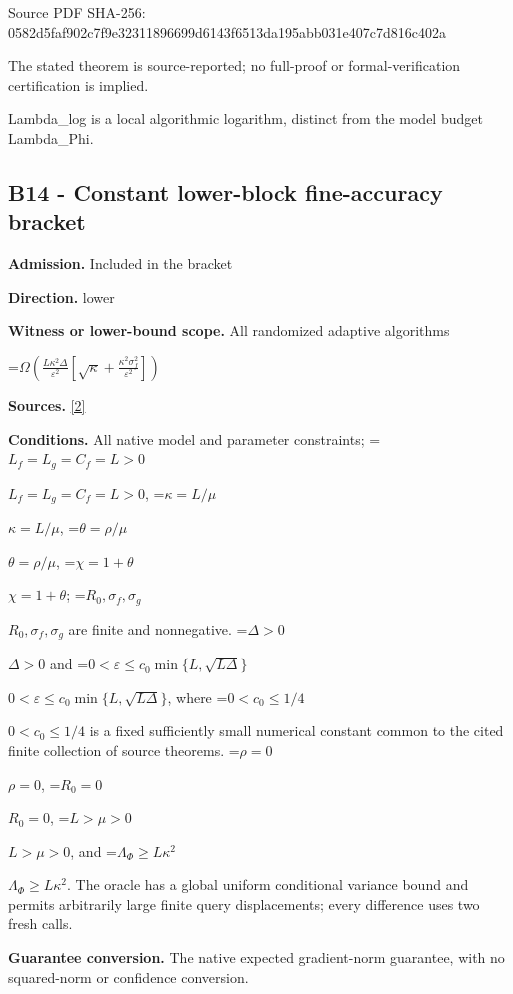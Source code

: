 \documentclass[10pt,a4paper]{article}
\newcommand{\AtlasMath}[1]{\par\begingroup\centering\setbox0=\hbox{$\displaystyle #1$}\ifdim\wd0>1.4\linewidth\typeout{ATLAS WIDE FORMULA: \the\wd0}\fi\ifdim\wd0>\linewidth\resizebox{\linewidth}{!}{\box0}\else\box0\fi\par\endgroup}
\newcommand{\AtlasInlineMath}[1]{\begingroup\setbox0=\hbox{$#1$}\ifdim\wd0>.4\linewidth\endgroup\AtlasMath{#1}\else\endgroup$#1$\fi}
\begin{document}
Source PDF SHA-256: 0582d5faf902c7f9e3231189\allowbreak{}6699d6143f6513da195abb03\allowbreak{}1e407c7d816c402a



The stated theorem is source-reported; no full-proof or formal-verification certification is implied.



Lambda\_log is a local algorithmic logarithm, distinct from the model budget Lambda\_Phi.



\subsection{B14 - Constant lower-block fine-accuracy bracket}


\textbf{Admission.} Included in the bracket



\textbf{Direction.} lower



\textbf{Witness or lower-bound scope.} All randomized adaptive algorithms



\AtlasMath{\Omega\!\left(\frac{L\kappa^2\Delta}{\varepsilon^2}\left[\sqrt\kappa+\frac{\kappa^2\sigma_f^2}{\varepsilon^2}\right]\right)}


\textbf{Sources.} \href{https://github.com/WU-Wendao/Colombo/blob/main/colombo_sensorium/Complexity_altas/data/sources/colombo/SFO_JOINT_20261126/manuscript.pdf}{[2]}



\textbf{Conditions.} All native model and parameter constraints; \AtlasInlineMath{L_f=L_g=C_f=L>0}, \AtlasInlineMath{\kappa=L/\mu}, \AtlasInlineMath{\theta=\rho/\mu}, \AtlasInlineMath{\chi=1+\theta}; \AtlasInlineMath{R_0,\sigma_f,\sigma_g} are finite and nonnegative. \AtlasInlineMath{\Delta>0} and \AtlasInlineMath{0<\varepsilon\le c_0\min\{L,\sqrt{L\Delta}\}}, where \AtlasInlineMath{0<c_0\le1/4} is a fixed sufficiently small numerical constant common to the cited finite collection of source theorems. \AtlasInlineMath{\rho=0}, \AtlasInlineMath{R_0=0}, \AtlasInlineMath{L>\mu>0}, and \AtlasInlineMath{\Lambda_\Phi\ge L\kappa^2}. The oracle has a global uniform conditional variance bound and permits arbitrarily large finite query displacements; every difference uses two fresh calls.



\textbf{Guarantee conversion.} The native expected gradient-norm guarantee, with no squared-norm or confidence conversion.
\end{document}
